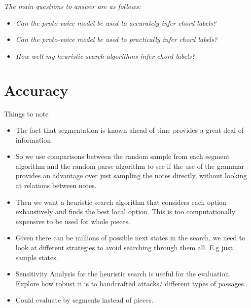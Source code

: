 \documentclass[12pt,a4paper,twoside,openright]{report}
\theoremstyle{definition}
\begin{document}
\textit{The main questions to answer are as follows:}
\begin{itemize}
  \item \textit{Can the proto-voice model be used to accurately infer chord labels?}
  \item \textit{Can the proto-voice model be used to practically infer chord labels?}
  \item \textit{How well my heuristic search algorithms infer chord labels?}
\end{itemize}

\section{Accuracy}
Things to note
\begin{itemize}
  \item The fact that segmentation is known ahead of time provides a great deal of information \cite{gothamWhatIfWhen2021}
  \item So we use comparisons between the random sample from each segment algorithm and the random parse algorithm to see if the use of the grammar provides an advantage over just sampling the notes directly, without looking at relations between notes.
  \item Then we want a heuristic search algorithm that considers each option exhaustively and finds the best local option. This is too computationally expensive to be used for whole pieces. 
  \item Given there can be millions of possible next states in the search, we need to look at different strategies to avoid searching through them all. E.g just sample states. 
  \item Sensitivity Analysis for the heuristic search is useful for the evaluation. Explore how robust it is to handcrafted attacks/ different types of passages.
  \item Could evaluate by segments instead of pieces. 
\end{itemize}
\end{document}
